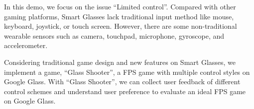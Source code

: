 \documentclass{sig-alternate}
\begin{document}
In this demo, we focus on the issue ``Limited control''. Compared with other gaming platforms, Smart Glasses lack traditional input method like mouse, keyboard, joystick, or touch screen. However, there are some non-traditional wearable sensors such as camera, touchpad, microphone, gyroscope, and accelerometer.





Considering traditional game design and new features on Smart Glasses, we implement a game, ``Glass Shooter'', a FPS game with multiple control styles on Google Glass. With ``Glass Shooter'', we can collect user feedback of different control schemes and understand user preference to evaluate an ideal FPS game on Google Glass. 
\end{document}

